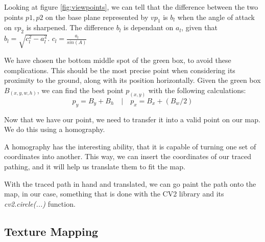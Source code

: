 Looking at figure \ref{fig:viewpoints}, we can tell that the difference between the two points \(p1,p2\) on the base plane represented by \(vp_1\) is \(b_l\) when the angle of attack on \(vp_2\) is sharpened. The difference \(b_l\) is dependant on \(a_l\), given that \(b_l = \sqrt{c_l^2-a_l^2}\). \(c_l = \frac{a_l}{sin(A)}\)\newline

We have chosen the bottom middle spot of the green box, to avoid these complications. This should be the most precise point when considering its proximity to the ground, along with its position horizontally. Given the green box \(B_(x,y,w,h)\), we can find the best point \(p_(x,y)\) with the following calculations:
\[p_y = B_y+B_h \quad | \quad p_x = B_x + (B_w / 2)\]

Now that we have our point, we need to transfer it into a valid point on our map. We do this using a homography.

A homography has the interesting ability, that it is capable of turning one set of coordinates into another. This way, we can insert the coordinates of our traced pathing, and it will help us translate them to fit the map.

With the traced path in hand and translated, we can go paint the path onto the map, in our case, something that is done with the CV2 library and its \textsl{cv2.circle(...)} function.

\subsection{Texture Mapping}

